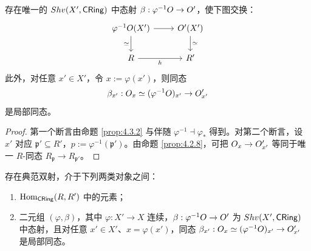 \begin{corollary}\label{cor:4.3.3}
存在唯一的 $Shv(X',\mathsf{CRing})$ 中态射 $\beta : \varphi^{-1}O \to O'$，使下图交换：
\[
\begin{tikzcd}
\varphi^{-1}\cO(X') \arrow[r] \arrow[d,"\simeq"'] & \cO'(X') \arrow[d,"\simeq"] \\
R \arrow[r,"h"'] & R'
\end{tikzcd}
\]
此外，对任意 $x' \in X'$，令 $x := \varphi(x')$，则同态
\[
\beta_{x'} : O_x \simeq (\varphi^{-1}O)_{x'} \to O'_{x'}
\]
是局部同态。
\end{corollary}

\begin{proof}
第一个断言由命题 \ref{prop:4.3.2} 与伴随 $\varphi^{-1} \dashv \varphi_*$ 得到。对第二个断言，设 $x'$ 对应 $\mathfrak p' \subseteq R'$，$p := \varphi^{-1}(\mathfrak p')$。由命题 \ref{prop:4.2.8}，可把 $O_x \to O'_{x'}$ 等同于唯一 $R$-同态 $R_{\mathfrak p} \to R_{\mathfrak p'}$。
\end{proof}

\begin{propcon}\label{prop:4.3.4}
存在典范双射，介于下列两类对象之间：
\begin{enumerate}[label=(\roman*),leftmargin=2em,itemsep=0.25ex]
  \item $\operatorname{Hom}_{\mathsf{CRing}}(R,R')$ 中的元素；
  \item 二元组 $(\varphi,\beta)$，其中 $\varphi : X' \to X$ 连续，$\beta : \varphi^{-1}O \to O'$ 为 $Shv(X',\mathsf{CRing})$ 中态射，且对任意 $x' \in X'$、$x = \varphi(x')$，同态 $\beta_{x'} : O_x \simeq (\varphi^{-1}O)_{x'} \to O'_{x'}$ 是局部同态。
\end{enumerate}
\end{propcon}

